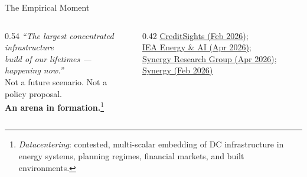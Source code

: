 \documentclass[aspectratio=169,11pt]{beamer}
\newcommand{\iconfull}[2]{\textcolor{#1}{\faIcon{#2}}}
\newcommand{\hl}[1]{\textcolor{dchighlight}{\textbf{#1}}}
\begin{document}
\begin{frame}{\iconfull{dcblue}{chart-bar}\enspace The Empirical Moment}
\vspace{0.6em}
\begin{columns}[T]
\begin{column}{0.54\textwidth}
  \normalsize\textit{``The largest concentrated infrastructure\\
  build of our lifetimes — happening now.''}\\[0.4em]
  \footnotesize Not a future scenario. Not a policy proposal.\\[0.2em]
  \hl{An arena in formation.}\footnote{\tiny\textit{Datacentering}: contested, multi-scalar embedding of DC infrastructure in energy systems, planning regimes, financial markets, and built environments.}
\end{column}
\begin{column}{0.42\textwidth}
  \vspace{0.1em}
  \scriptsize\textcolor{dcgray}{%
  \iconfull{dcgray}{book}\enspace
  \href{https://creditsights.com}{CreditSights (Feb 2026)};\\
  \href{https://www.iea.org/reports/energy-and-ai}{IEA Energy \& AI (Apr 2026)};\\
  \href{https://www.srgresearch.com/articles/hyperscale-operators-to-account-for-67-of-all-data-center-capacity-by-2031}{Synergy Research Group (Apr 2026)}; \href{https://www.srgresearch.com/articles/genai-helps-drive-quarterly-cloud-revenues-to-119-billion-as-growth-rate-jumped-yet-again-in-q4}{Synergy (Feb 2026)}}
\end{column}
\end{columns}
\end{frame}
\end{document}
